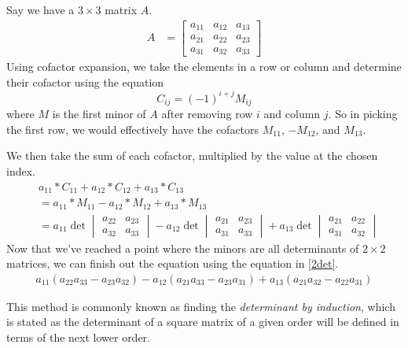 \begin{exmp}
Say we have a $3\times3$ matrix $A$.
\begin{align*}
    A &= 
    \begin{bmatrix}
        a_{11} & a_{12} & a_{13}\\
        a_{21} & a_{22} & a_{23}\\
        a_{31} & a_{32} & a_{33}
    \end{bmatrix}
\end{align*}
Using cofactor expansion, we take the elements in a row or column and determine
their cofactor using the equation
\begin{equation}
    C_{ij} = (-1)^{i+j}M_{ij}
\end{equation}
where $M$ is the first minor of $A$ after removing row $i$ and column $j$.
So in picking the first row, we would effectively have the cofactors $M_{11}$,
$-M_{12}$, and $M_{13}$.  

We then take the sum of each cofactor, multiplied by the value at the chosen
index.
\begin{align*}
    &a_{11}*C_{11} + 
    a_{12}*C_{12} + 
    a_{13}*C_{13} \\
    &= a_{11}*M_{11} - 
    a_{12}*M_{12} + 
    a_{13}*M_{13} \\
    &= a_{11}\det
    \begin{vmatrix}
        a_{22} & a_{23} \\
        a_{32} & a_{33} 
    \end{vmatrix}
    - a_{12}\det
    \begin{vmatrix}
        a_{21} & a_{23} \\
        a_{31} & a_{33} 
    \end{vmatrix}
    + a_{13}\det
    \begin{vmatrix}
        a_{21} & a_{22} \\
        a_{31} & a_{32} 
    \end{vmatrix}
\end{align*}
Now that we've reached a point where the minors are all determinants of $2
\times 2$ matrices, we can finish out the equation using the equation in
\ref{2det}.
\begin{align*}
    a_{11}(a_{22}a_{33}-a_{23}a_{32})
    - a_{12}(a_{21}a_{33}-a_{23}a_{31})
    + a_{13}(a_{21}a_{32}-a_{22}a_{31})
\end{align*}
\end{exmp}

This method is commonly known as
finding the \emph{determinant by induction}, which is stated as the determinant
of a square matrix of a given order will be defined in terms of the next lower
order. 

